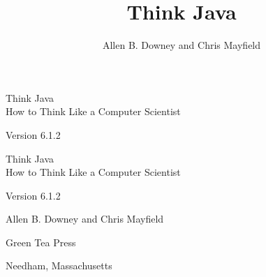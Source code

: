 \documentclass[12pt]{book}
\title{Think Java}
\author{Allen B. Downey and Chris Mayfield}
\newcommand{\thetitle}{Think Java}
\newcommand{\thesubtitle}{How to Think Like a Computer Scientist}
\newcommand{\theauthors}{Allen B. Downey and Chris Mayfield}
\newcommand{\theversion}{6.1.2}
\theoremstyle{exercise}
\newif\ifplastex
\begin{document}
\frontmatter

\ifplastex

\maketitle

\else

\begin{latexonly}

\thispagestyle{empty}

\begin{flushright}
\vspace*{2.0in}

\begin{spacing}{3}
{\huge \thetitle} \\
{\Large \thesubtitle}
\end{spacing}

\vspace{0.25in}

Version \theversion

\vfill
\end{flushright}

\newpage
\thispagestyle{empty}

\quad

\newpage
\thispagestyle{empty}

\begin{flushright}
\vspace*{2.0in}

\begin{spacing}{3}
{\huge \thetitle} \\
{\Large \thesubtitle}
\end{spacing}

\vspace{0.25in}

Version \theversion

\vspace{1in}

{\Large \theauthors}

\vspace{0.5in}

{\Large Green Tea Press}

{\small Needham, Massachusetts}

\vfill
\end{flushright}


\end{latexonly}
\end{document}
